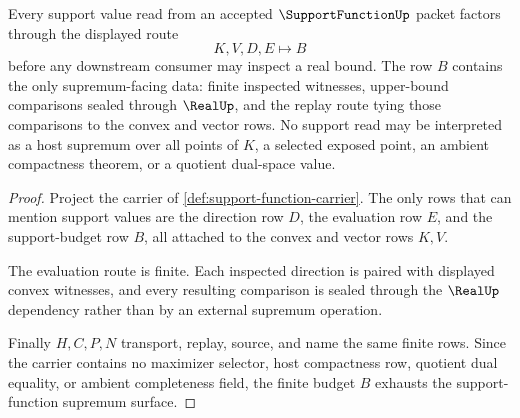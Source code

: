 \begin{theorem}
\label{thm:support-function-finite-supremum-budget}
Every support value read from an accepted $\SupportFunctionUp$ packet factors through the displayed route
$$
K,V,D,E \longmapsto B
$$
before any downstream consumer may inspect a real bound. The row $B$ contains the only supremum-facing data: finite inspected witnesses, upper-bound comparisons sealed through $\RealUp$, and the replay route tying those comparisons to the convex and vector rows. No support read may be interpreted as a host supremum over all points of $K$, a selected exposed point, an ambient compactness theorem, or a quotient dual-space value.
\end{theorem}
\begin{proof}
Project the carrier of \autoref{def:support-function-carrier}. The only rows that can mention support values are the direction row $D$, the evaluation row $E$, and the support-budget row $B$, all attached to the convex and vector rows $K,V$.

The evaluation route is finite. Each inspected direction is paired with displayed convex witnesses, and every resulting comparison is sealed through the $\RealUp$ dependency rather than by an external supremum operation.

Finally $H,C,P,N$ transport, replay, source, and name the same finite rows. Since the carrier contains no maximizer selector, host compactness row, quotient dual equality, or ambient completeness field, the finite budget $B$ exhausts the support-function supremum surface.
\end{proof}

